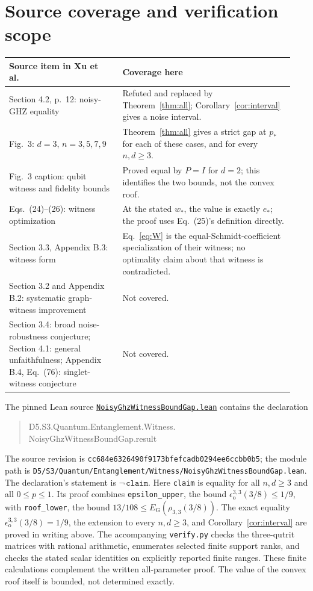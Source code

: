 \documentclass[11pt]{article}
\newcommand{\EG}{E_{\mathrm G}}
\newcommand{\eps}{\epsilon_{\mathrm o}}
\begin{document}
\section{Source coverage and verification scope}
\begin{center}
\small
\begin{tabular}{@{}p{0.37\linewidth}p{0.57\linewidth}@{}}
\toprule
Source item in Xu et al.\ \cite{xu} & Coverage here\\
\midrule
Section 4.2, p.~12: noisy-GHZ equality & Refuted and replaced by
Theorem~\ref{thm:all}; Corollary~\ref{cor:interval} gives a noise interval.\\
Fig.~3: $d=3$, $n=3,5,7,9$ & Theorem~\ref{thm:all} gives a strict gap
at $p_*$ for each of these cases, and for every $n,d\geq3$.\\
Fig.~3 caption: qubit witness and fidelity bounds & Proved equal by
$P=I$ for $d=2$; this identifies the two bounds, not the convex roof.\\
Eqs.~(24)--(26): witness optimization & At the stated $w_*$, the value
is exactly $e_*$; the proof uses Eq.~(25)'s definition directly.\\
Section 3.3, Appendix B.3: witness form & Eq.~\eqref{eq:W} is the
equal-Schmidt-coefficient specialization of their witness; no optimality
claim about that witness is contradicted.\\
Section 3.2 and Appendix B.2: systematic graph-witness improvement & Not covered.\\
Section 3.4: broad noise-robustness conjecture; Section 4.1: general
unfaithfulness; Appendix B.4, Eq.~(76): singlet-witness conjecture & Not covered.\\
\bottomrule
\end{tabular}
\end{center}

The pinned Lean source
\href{https://github.com/the-omega-institute/trureturing/blob/cc684e6326490f9173bfefcadb0294ee6ccbb0b5/D5/S3/Quantum/Entanglement/Witness/NoisyGhzWitnessBoundGap.lean}{\texttt{NoisyGhzWitnessBoundGap.lean}}
contains the declaration
\begin{quote}\small\ttfamily
D5.S3.Quantum.Entanglement.Witness.\\
NoisyGhzWitnessBoundGap.result
\end{quote}
The source revision is
\texttt{cc684e6326490f9173bfefcadb0294ee6ccbb0b5}; the module path is
\nolinkurl{D5/S3/Quantum/Entanglement/Witness/NoisyGhzWitnessBoundGap.lean}.
The declaration's statement is
$\neg\,\texttt{claim}$. Here \texttt{claim} is equality for all
$n,d\geq3$ and all $0\leq p\leq1$.
Its proof combines \texttt{epsilon\_upper}, the bound
$\eps^{3,3}(3/8)\leq1/9$, with \texttt{roof\_lower}, the bound
$13/108\leq\EG(\rho_{3,3}(3/8))$.
The exact equality $\eps^{3,3}(3/8)=1/9$, the extension to every
$n,d\geq3$, and Corollary~\ref{cor:interval} are proved in writing above.
The accompanying \texttt{verify.py} checks the three-qutrit matrices
with rational arithmetic, enumerates selected finite support ranks, and
checks the stated scalar identities on explicitly reported finite ranges.
These finite calculations complement the written all-parameter proof.
The value of the convex roof itself is bounded, not determined exactly.
\end{document}
